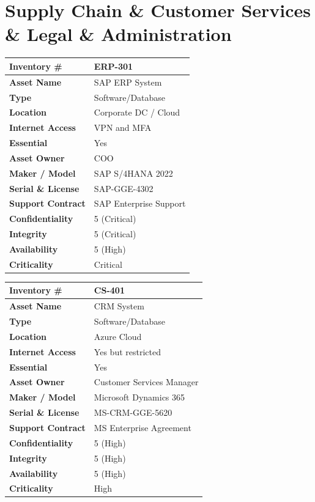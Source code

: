 \section*{Supply Chain \& Customer Services \& Legal \& Administration}

\begin{longtable}{|p{4cm}|p{9cm}|}
\hline
\textbf{Inventory \#} & \ac{ERP}-301 \\\hline
\textbf{Asset Name} & \ac{SAP} \ac{ERP} System \\\hline
\textbf{Type} & Software/Database \\\hline
\textbf{Location} & Corporate DC / Cloud \\\hline
\textbf{Internet Access} & \ac{VPN} and \ac{MFA} \\\hline
\textbf{Essential} & Yes \\\hline
\textbf{Asset Owner} & \ac{COO} \\\hline
\textbf{Maker / Model} & \ac{SAP} S/4HANA 2022 \\\hline
\textbf{Serial \& License} & \ac{SAP}-GGE-4302 \\\hline
\textbf{Support Contract} & \ac{SAP} Enterprise Support \\\hline
\textbf{Confidentiality} & 5 (Critical) \\\hline
\textbf{Integrity} & 5 (Critical) \\\hline
\textbf{Availability} & 5 (High) \\\hline
\textbf{Criticality} & Critical \\\hline
\end{longtable}

\begin{longtable}{|p{4cm}|p{9cm}|}
\hline
\textbf{Inventory \#} & CS-401 \\\hline
\textbf{Asset Name} & \ac{CRM} System \\\hline
\textbf{Type} & Software/Database \\\hline
\textbf{Location} & Azure Cloud \\\hline
\textbf{Internet Access} & Yes but restricted \\\hline
\textbf{Essential} & Yes \\\hline
\textbf{Asset Owner} & Customer Services Manager \\\hline
\textbf{Maker / Model} & Microsoft Dynamics 365 \\\hline
\textbf{Serial \& License} & MS-\ac{CRM}-GGE-5620 \\\hline
\textbf{Support Contract} & MS Enterprise Agreement \\\hline
\textbf{Confidentiality} & 5 (High) \\\hline
\textbf{Integrity} & 5 (High) \\\hline
\textbf{Availability} & 5 (High) \\\hline
\textbf{Criticality} & High \\\hline
\end{longtable}


